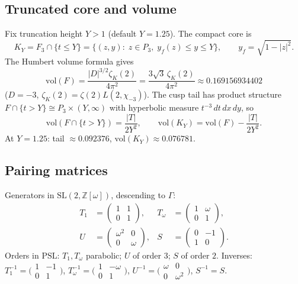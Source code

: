 \documentclass[11pt]{amsart}
\newcommand{\ZZ}{\mathbb{Z}}
\newcommand{\PSL}{\mathrm{PSL}}
\newcommand{\vol}{\mathrm{vol}}
\begin{document}
\subsection{Truncated core and volume}

Fix truncation height $Y>1$ (default $Y=1.25$).  The compact core is
\[
  K_Y=F_3\cap\{t\le Y\}
  =\bigl\{(z,y):\;z\in P_3,\; y_f(z)\le y\le Y\bigr\},
  \qquad y_f=\sqrt{1-|z|^2}.
\]
The Humbert volume formula gives
\[
  \vol(F)=\frac{|D|^{3/2}\zeta_K(2)}{4\pi^2}
  =\frac{3\sqrt{3}\,\zeta_K(2)}{4\pi^2}
  \approx 0.169156934402
\]
($D=-3$, $\zeta_K(2)=\zeta(2)L(2,\chi_{-3})$).  The cusp tail has product
structure $F\cap\{t>Y\}\cong P_3\times(Y,\infty)$ with hyperbolic measure
$t^{-3}\,dt\,dx\,dy$, so
\[
  \vol(F\cap\{t>Y\})=\frac{|T|}{2Y^2},\qquad
  \vol(K_Y)=\vol(F)-\frac{|T|}{2Y^2}.
\]
At $Y=1.25$: tail $\approx 0.092376$, $\vol(K_Y)\approx 0.076781$.

\subsection{Pairing matrices}

Generators in $\mathrm{SL}(2,\ZZ[\omega])$, descending to $\Gamma$:
\begin{align*}
  T_1&=\begin{pmatrix}1&1\\0&1\end{pmatrix},&
  T_\omega&=\begin{pmatrix}1&\omega\\0&1\end{pmatrix},\\
  U&=\begin{pmatrix}\omega^2&0\\0&\omega\end{pmatrix},&
  S&=\begin{pmatrix}0&-1\\1&0\end{pmatrix}.
\end{align*}
Orders in $\PSL$: $T_1,T_\omega$ parabolic; $U$ of order $3$; $S$ of order
$2$.  Inverses: $T_1^{-1}=\bigl(\begin{smallmatrix}1&-1\\0&1\end{smallmatrix}\bigr)$,
$T_\omega^{-1}=\bigl(\begin{smallmatrix}1&-\omega\\0&1\end{smallmatrix}\bigr)$,
$U^{-1}=\bigl(\begin{smallmatrix}\omega&0\\0&\omega^2\end{smallmatrix}\bigr)$,
$S^{-1}=S$.
\end{document}
